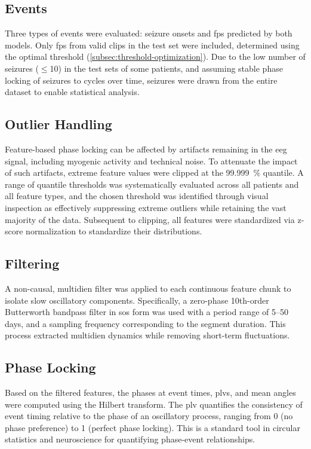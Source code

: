 \subsection{Events} \label{subsec:cycle-events}
Three types of events were evaluated: seizure onsets and \glspl{fp} predicted by both models.
Only \glspl{fp} from valid clips in the test set were included, determined using the optimal threshold (\cref{subsec:threshold-optimization}).
Due to the low number of seizures ($\leq$10) in the test sets of some patients, and assuming stable phase locking of seizures to cycles over time, seizures were drawn from the entire dataset to enable statistical analysis.


\subsection{Outlier Handling} \label{subsec:cycle-outlier}
Feature-based phase locking can be affected by artifacts remaining in the \gls{eeg} signal, including myogenic activity and technical noise.
To attenuate the impact of such artifacts, extreme feature values were clipped at the \SI{99.999}{\percent} quantile.
A range of quantile thresholds was systematically evaluated across all patients and all feature types, and the chosen threshold was identified through visual inspection as effectively suppressing extreme outliers while retaining the vast majority of the data.
Subsequent to clipping, all features were standardized via z-score normalization to standardize their distributions.

\subsection{Filtering} \label{subsec:cycle-filtering}
A non-causal, multidien filter was applied to each continuous feature chunk to isolate slow oscillatory components.
Specifically, a zero-phase 10th-order Butterworth bandpass filter in \gls{sos} form was used with a period range of 5--50 days, and a sampling frequency corresponding to the segment duration.
This process extracted multidien dynamics while removing short-term fluctuations.

\subsection{Phase Locking} \label{subsec:phase-locking}
Based on the filtered features, the phases at event times, \glspl{plv}, and mean angles were computed using the Hilbert transform.
The \gls{plv} quantifies the consistency of event timing relative to the phase of an oscillatory process, ranging from 0 (no phase preference) to 1 (perfect phase locking).
This is a standard tool in circular statistics and neuroscience for quantifying phase-event relationships.

